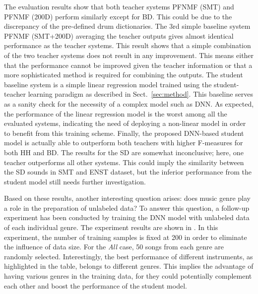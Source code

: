 \documentclass{article}
\begin{document}
%

%
The evaluation results show that both teacher systems PFNMF (SMT) and PFNMF (200D) perform similarly except for BD. This could be due to the discrepancy of the pre-defined drum dictionaries. 
The 3rd simple baseline system PFNMF (SMT+200D) averaging the teacher outputs gives almost identical performance as the teacher systems. This result shows that a simple combination of the two teacher systems does not result in any improvement. This means either that the performance cannot be improved given the teacher information or that a more sophisticated method is required for combining the outputs. 
The student baseline system is a simple linear regression model trained using the student-teacher learning paradigm as described in Sect.~\ref{sec:method}. This baseline serves as a sanity check for the necessity of a complex model such as DNN. As expected, the performance of the linear regression model is the worst among all the evaluated systems, indicating the need of deploying a non-linear model in order to benefit from this training scheme. 
Finally, the proposed DNN-based student model is actually able to outperform both teachers with higher F-measures for both HH and BD. %
The results for the SD are somewhat inconclusive; here, one teacher outperforms all other systems. This could imply the similarity between the SD sounds in SMT and ENST dataset, but the inferior performance from the student model still needs further investigation. 

Based on these results, another interesting question arises: does music genre play a role in the preparation of unlabeled data? To answer this question, a follow-up experiment has been conducted by training the DNN model with unlabeled data of each individual genre. The experiment results are shown in . In this experiment, the number of training samples is fixed at 200 in order to eliminate the influence of data size. For the \textit{All} case, 50 songs from each genre are randomly selected. Interestingly, the best performance of different instruments, as highlighted in the table, belongs to different genres. This implies the advantage of having various genres in the training data, for they could potentially complement each other and boost the performance of the student model. %
\end{document}
